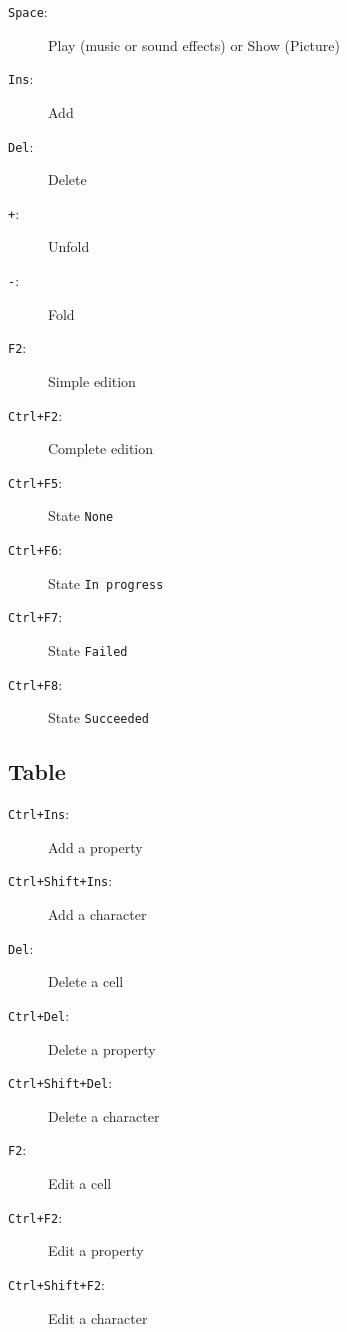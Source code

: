 \documentclass[a4paper,12pt]{article}
\newcommand*{\interfaceitem}[1]{\texttt{#1}}
\begin{document}
\begin{description}
    \item[\interfaceitem{Space}:]{Play (music or sound effects) or Show (Picture)}
    \item[\interfaceitem{Ins}:]{Add}
    \item[\interfaceitem{Del}:]{Delete}
    \item[\interfaceitem{+}:]{Unfold}
    \item[\interfaceitem{-}:]{Fold}
    \item[\interfaceitem{F2}:]{Simple edition}
    \item[\interfaceitem{Ctrl+F2}:]{Complete edition}
    \item[\interfaceitem{Ctrl+F5}:]{State \interfaceitem{None}}
    \item[\interfaceitem{Ctrl+F6}:]{State \interfaceitem{In progress}}
    \item[\interfaceitem{Ctrl+F7}:]{State \interfaceitem{Failed}}
    \item[\interfaceitem{Ctrl+F8}:]{State \interfaceitem{Succeeded}}
\end{description}

\subsection{Table}

\begin{description}
    \item[\interfaceitem{Ctrl+Ins}:]{Add a property}
    \item[\interfaceitem{Ctrl+Shift+Ins}:]{Add a character}
    \item[\interfaceitem{Del}:]{Delete a cell}
    \item[\interfaceitem{Ctrl+Del}:]{Delete a property}
    \item[\interfaceitem{Ctrl+Shift+Del}:]{Delete a character}
    \item[\interfaceitem{F2}:]{Edit a cell}
    \item[\interfaceitem{Ctrl+F2}:]{Edit a property}
    \item[\interfaceitem{Ctrl+Shift+F2}:]{Edit a character}
\end{description}
\end{document}

